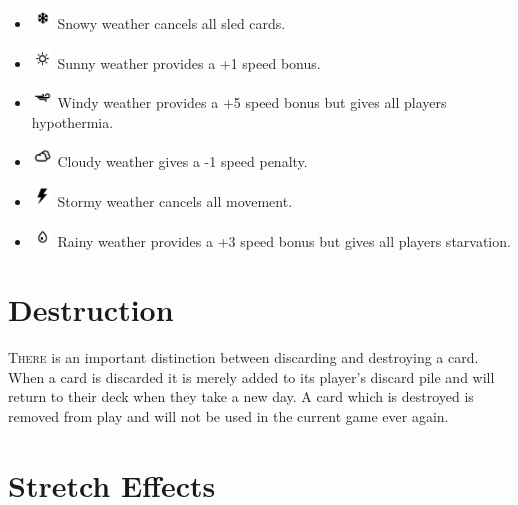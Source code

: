 \documentclass{article}
\begin{document}
\begin{multicols}{3}
    \begin{itemize}
        \setlength\itemsep{-1em}
        \item \includegraphics[width=1.5em]{images/die/snowflake} Snowy weather cancels all sled cards.
        \item \includegraphics[width=1.5em]{images/die/sun} Sunny weather provides a +1 speed bonus.
        \item \includegraphics[width=1.5em]{images/die/wind} Windy weather provides a +5 speed bonus but gives all players hypothermia.
        \item \includegraphics[width=1.5em]{images/die/cloud} Cloudy weather gives a -1 speed penalty.
        \item \includegraphics[width=1.5em]{images/die/storm} Stormy weather cancels all movement.
        \item \includegraphics[width=1.5em]{images/die/rain} Rainy weather provides a +3 speed bonus but gives all players starvation.
    \end{itemize}

\section{Destruction}

    \textsc{There} is an important distinction between discarding and destroying a card.
    When a card is discarded it is merely added to its player's discard pile and
    will return to their deck when they take a new day. A card which is
    destroyed is removed from play and will not be used in the current game ever
    again.

\section{Stretch Effects}


\end{multicols}
\end{document}

